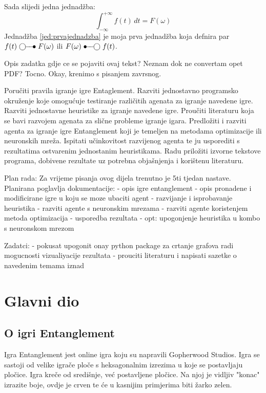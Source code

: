 \documentclass[zavrsnirad]{fer}
\begin{document}
Sada slijedi jedna jednadžba:
\begin{equation}
  \label{jed:prvajednadzba}
  \int_{-\infty}^{+\infty}f(t)\,dt=F(\omega)
\end{equation}
Jednadžba \eqref{jed:prvajednadzba} je moja prva jednadžba koja defnira par $f(t)\ufrek F(\omega)$ ili $F(\omega)\uvrem f(t)$.

Opis zadatka gdje ce se pojaviti ovaj tekst? Neznam dok ne convertam opet PDF? Tocno.
Okay, krenimo s pisanjem zavrsnog.

Poručiti pravila igranje igre Entaglement. Razviti jednostavno programsko okruženje koje omogućuje testiranje različitih agenata za igranje navedene igre. Razviti jednostavne heuristike za igranje navedene igre. Proučiti literaturu koja se bavi razvojem agenata za slične probleme igranje igara. Predložiti i razviti agenta za igranje igre Entanglement koji je temeljen na metodama optimizacije ili neuronskih mreža. Ispitati učinkovitost razvijenog agenta te ju usporediti s rezultatima ostvarenim jednostanim heuristikama. Radu priložiti izvorne tekstove programa, dobivene rezultate uz potrebna objašnjenja i korištenu literaturu.

Plan rada:
Za vrijeme pisanja ovog dijela trenutno je 5ti tjedan nastave.
Planirana poglavlja dokumentacije:
- opis igre entanglement
- opis pronadene i modificirane igre u koju se moze ubaciti agent
- razvijanje i isprobavanje heuristika
- razviti agente s neuronskim mrezama
- razviti agente koristenjem metoda optimizacija
- usporedba rezultata
- opt: upogonjenje heuristika u kombo s neuronskom mrezom

Zadatci:
- pokusat upogonit onay python package za crtanje grafova radi mogucnosti vizualiyacije rezultata
- prouciti literaturu i napisati sazetke o navedenim temama iznad



\chapter{Glavni dio}
\label{pog:glavni_dio}

\section{O igri Entanglement}
\label{pog:o_igri}


Igra Entanglement jest online igra koju su napravili \cite{gopherwoodstudios} Gopherwood Studios. Igra se sastoji od velike igrače ploče s heksagonalnim izrezima u koje se postavljaju pločice. Igra kreče od središnje, već postavljene pločice. Na njoj je vidljiv "konac" izrazite boje, ovdje je crven te će u kasnijim primjerima biti žarko zelen.
\end{document}
